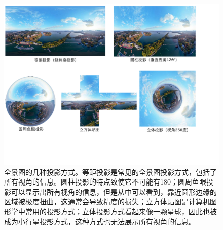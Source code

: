 \begin{figure}[!htbp]
    \centering
    \includegraphics[width=1.0\textwidth]{Img/panorama-projection.pdf}

    \caption[全景图的几种投影方式]
    {
        \label{fig:panorama-projection}
        全景图的几种投影方式。等距投影是常见的全景图投影方式，包括了所有视角的信息。圆柱投影的特点致使它不可能有180；圆周鱼眼投影可以显示出所有视角的信息，但是从中可以看到，靠近圆形边缘的区域被极度扭曲，这通常会导致精度的损失；立方体贴图是计算机图形学中常用的投影方式；立体投影方式看起来像一颗星球，因此也被成为小行星投影方式，这种方式也无法展示所有视角的信息。
    }
\end{figure}